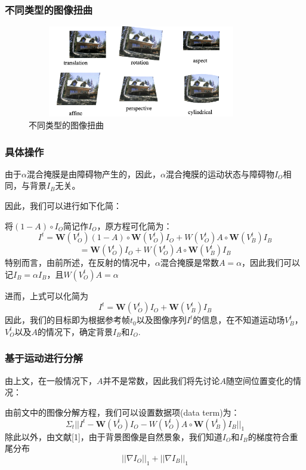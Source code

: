 \documentclass{beamer}
\begin{document}
\begin{frame}
\frametitle{不同类型的图像扭曲}
\begin{figure}[!h]
\centering
\includegraphics[height=4cm,width=10cm]{2022122602.png}
\caption{不同类型的图像扭曲}
\end{figure}
\end{frame}
\begin{frame}
\frametitle{具体操作}
由于$\alpha$混合掩膜是由障碍物产生的，因此，$\alpha$混合掩膜的运动状态与障碍物$I_O$相同，与背景$I_B$无关。\pause

因此，我们可以进行如下化简：

将$(1-A)\circ I_O$简记作$I_O$，原方程可化简为：
\begin{equation}
I^t = \textbf{W}(V_O^t)(1-A)\circ\textbf{W}(V_O^t)I_O+W(V_O^t)A\circ\textbf{W}(V_B^t)I_B
\end{equation}
\begin{equation}
=\textbf{W}(V_O^t)I_O+W(V_O^t)A\circ\textbf{W}(V_B^t)I_B
\end{equation}\pause
特别而言，由前所述，在反射的情况中，$\alpha$混合掩膜是常数$A=\alpha$，因此我们可以记$I_B = \alpha I_B$，且$W(V_O^t)A = \alpha$

进而，上式可以化简为
\begin{equation}
I^t = \textbf{W}(V_O^t)I_O+\textbf{W}(V_B^t)I_B
\end{equation}\pause
因此，我们的目标即为根据参考帧$t_0$以及图像序列${I^t}$的信息，在不知道运动场$V_B^t$，$V_O^t$以及$A$的情况下，确定背景$I_B$和$I_O$.
\end{frame}
\begin{frame}
\frametitle{基于运动进行分解}
由上文，在一般情况下，$A$并不是常数，因此我们将先讨论$A$随空间位置变化的情况：

由前文中的图像分解方程，我们可以设置数据项(data term)为：
\begin{equation}
\Sigma_t ||I^t-\textbf{W}(V_O^t)I_O-W(V_O^t)A\circ\textbf{W}(V_B^t)I_B||_1
\end{equation}
除此以外，由文献[1]，由于背景图像是自然景象，我们知道$I_O$和$I_B$的梯度符合重尾分布
\begin{equation}
||\nabla I_O||_1+||\nabla I_B||_1
\end{equation}
\end{frame}
\end{document}
